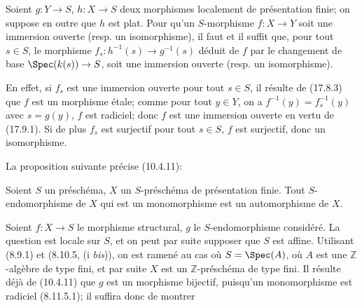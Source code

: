 \begin{corollary}[17.9.5]
\label{IV.17.9.5}
Soient $g:Y\to S$, $h:X\to S$ deux morphismes localement de présentation finie; on suppose en outre que $h$ est plat. Pour qu'un $S$-morphisme $f:X\to Y$ soit une immersion ouverte (resp. un isomorphisme), il faut et il suffit que, pour tout $s\in S$, le morphisme $f_s:h^{-1}(s)\to g^{-1}(s)$ déduit de $f$ par le changement de base $\Spec(k(s))\to S$, soit une immersion ouverte (resp. un isomorphisme).
\end{corollary}

En effet, si $f_s$ est une immersion ouverte pour tout $s\in S$, il résulte de (17.8.3) que $f$ est un morphisme étale; comme pour tout $y\in Y$, on a $f^{-1}(y)=f_s^{-1}(y)$ avec $s=g(y)$, $f$ est radiciel; donc $f$ est une immersion ouverte en vertu de (17.9.1). Si de plus $f_s$ est surjectif pour tout $s\in S$, $f$ est surjectif, donc un isomorphisme.

La proposition suivante précise (10.4.11):

\begin{proposition}[17.9.6]
\label{IV.17.9.6}
Soient $S$ un préschéma, $X$ un $S$-préschéma de présentation finie. Tout $S$-endomorphisme de $X$ qui est un monomorphisme est un automorphisme de $X$.
\end{proposition}

Soient $f:X\to S$ le morphisme structural, $g$ le $S$-endomorphisme considéré. La question est locale sur $S$, et on peut par suite supposer que $S$ est affine. Utilisant (8.9.1) et (8.10.5, (i \emph{bis})), on est ramené au cas où $S=\Spec(A)$, où $A$ est une $\mathbb{Z}$-algèbre de type fini, et par suite $X$ est un $\mathbb{Z}$-préschéma de type fini. Il résulte déjà de (10.4.11) que $g$ est un morphisme bijectif, puisqu'un monomorphisme est radiciel (8.11.5.1); il suffira donc de montrer


